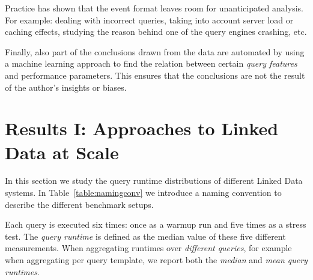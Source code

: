 \documentclass[twocolumn]{bmcart}%
\newcommand\todo[1]{\textcolor{red}{#1}}
\begin{document}
Practice has shown that the event format leaves room for unanticipated analysis. For example: dealing with incorrect queries, taking into account server load or caching effects, studying the reason behind one of the query engines crashing, etc.

Finally, also part of the conclusions drawn from the data are automated by using a machine learning approach to find the relation between certain \emph{query features} and performance parameters. This ensures that the conclusions are not the result of the author's insights or biases. 





%

\section{Results I: Approaches to Linked Data at Scale}
\label{sec:tradeoffs}
%

In this section we study the query runtime distributions of different Linked Data systems. 
In Table~\ref{table:namingconv} we introduce a naming convention to describe the different benchmark setups. 

Each query is executed six times: once as a warmup run and five times as a stress test. The \emph{query runtime} is defined as the median value of these five different measurements.
When aggregating runtimes over \emph{different queries}, for example when aggregating per query template, we report both the \emph{median} and \emph{mean query runtimes}. 

\end{document}
